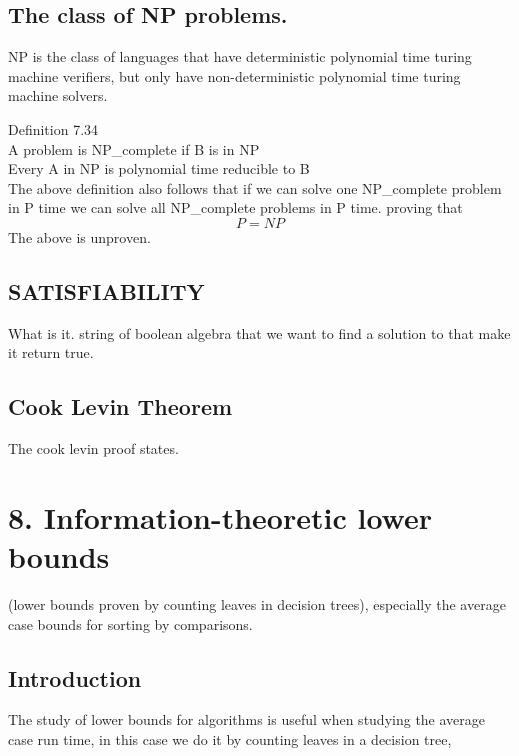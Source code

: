 \documentclass[a4paper,10pt,titlepage]{report}
\begin{document}
\subsection{The class of NP problems.}
NP is the class of languages that have deterministic polynomial time turing machine verifiers, but only have non-deterministic polynomial time turing machine solvers.

Definition 7.34\\
A problem is NP\_complete if B is in NP\\
Every A in NP is polynomial time reducible to B\\

The above definition also follows that if we can solve one NP\_complete problem in P time we can solve all NP\_complete problems in P time. proving that\\
\begin{equation}
P = NP
\end{equation}
The above is unproven. \\

\subsection{SATISFIABILITY}

What is it. string of boolean algebra that we want to find a solution to that make it return true.

\subsection{Cook Levin Theorem}
The cook levin proof states.



\newpage
\section{8. Information-theoretic lower bounds}

(lower bounds proven by counting leaves in decision trees), especially the average case bounds for sorting
by comparisons.

\subsection{Introduction}

The study of lower bounds for algorithms is useful when studying the average case run time, in this case we do it by counting leaves in a decision tree,
\end{document}
